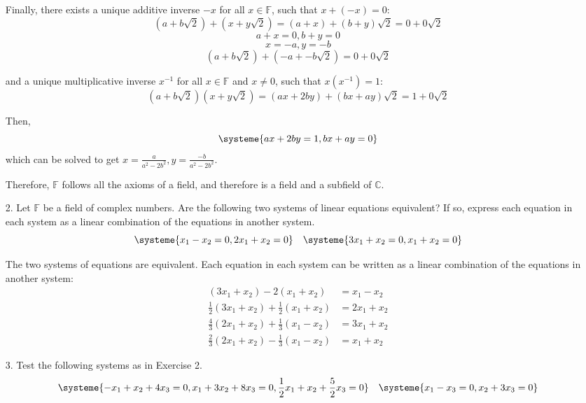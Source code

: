 \documentclass{article}
\begin{document}
\begin{enumerate}[listparindent=\parindent]
    Finally, there exists a unique additive inverse \(-x\) for all \(x \in \mathbb F\),
    such that \(x + (-x) = 0\):
    \[(a + b\sqrt{2}) + (x + y\sqrt{2}) = (a + x) + (b + y)\sqrt{2} = 0 + 0\sqrt{2}\]
    \[a + x = 0, b + y = 0\]
    \[x = -a, y = -b\]
    \[(a + b\sqrt{2}) + (-a + -b\sqrt{2}) = 0 + 0\sqrt{2}\]

    and a unique multiplicative inverse \(x^{-1}\) for all \(x \in \mathbb F\) and \(x \neq 0\),
    such that \(x(x^{-1}) = 1\):
    \[(a + b\sqrt{2})(x + y\sqrt{2}) = (ax + 2by) + (bx + ay)\sqrt{2} = 1 + 0\sqrt{2} \]

    Then,
    \[
        \systeme{
            ax + 2by = 1,
            bx + ay = 0
        }
    \]
    which can be solved to get \(x = \frac{a}{a^2 - 2b^2}, y = \frac{-b}{a^2 - 2b^2}\).

    Therefore, \(\mathbb F\) follows all the axioms of a field,
    and therefore is a field and a subfield of \(\mathbb C\).

\item[2.] Let \(\mathbb F\) be a field of complex numbers. Are the following two systems of linear equations equivalent?
    If so, express each equation in each system as a linear combination of the equations in another system.
    \[
        \systeme{
            x_1 - x_2 = 0,
            2x_1 + x_2 = 0
        }
        \quad
        \systeme{
            3x_1 + x_2 = 0,
            x_1 + x_2 = 0
        }
    \]

    The two systems of equations are equivalent.
    Each equation in each system can be written as a linear combination of the equations in another system:
    \[
        \begin{alignedat}{2}
                        (3x_1+x_2) -           2 (x_1+x_2) &=  x_1-x_2 \\
            \frac{1}{2} (3x_1+x_2) + \frac{1}{2} (x_1+x_2) &= 2x_1+x_2 \\
            \frac{4}{3} (2x_1+x_2) + \frac{1}{3} (x_1-x_2) &= 3x_1+x_2 \\
            \frac{2}{3} (2x_1+x_2) - \frac{1}{3} (x_1-x_2) &=  x_1+x_2
        \end{alignedat}
    \]

\item[3.] Test the following systems as in Exercise 2.
    \[
        \systeme{
            -x_1 + x_2 + 4x_3 = 0,
            x_1 + 3x_2 + 8x_3 = 0,
            \frac{1}{2}x_1 + x_2 + \frac{5}{2}x_3 = 0
        }
        \quad
        \systeme{
            x_1 - x_3 = 0,
            x_2 + 3x_3 = 0
        }
    \]


\end{enumerate}
\end{document}
